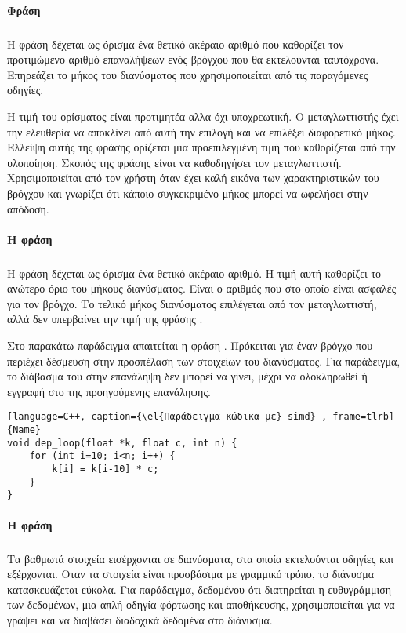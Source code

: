 \paragraph{Φράση \emph{}}
\subparagraph{}
Η φράση \emph{} δέχεται ως όρισμα ένα θετικό ακέραιο αριθμό που καθορίζει τον προτιμώμενο αριθμό επαναλήψεων ενός βρόγχου που θα εκτελούνται ταυτόχρονα. Επηρεάζει το μήκος του διανύσματος που χρησιμοποιείται από τις παραγόμενες \emph{} οδηγίες.

Η τιμή του ορίσματος είναι προτιμητέα αλλα όχι υποχρεωτική. Ο μεταγλωττιστής έχει την ελευθερία να αποκλίνει από αυτή την επιλογή και να επιλέξει διαφορετικό μήκος. Ελλείψη αυτής της φράσης ορίζεται μια προεπιλεγμένη τιμή που καθορίζεται από την υλοποίηση. Σκοπός της φράσης \emph{} είναι να καθοδηγήσει τον μεταγλωττιστή. Χρησιμοποιείται από τον χρήστη όταν έχει καλή εικόνα των χαρακτηριστικών του βρόγχου και γνωρίζει ότι κάποιο συγκεκριμένο μήκος μπορεί να ωφελήσει στην απόδοση.
\ \\

\paragraph{H φράση \emph{}}
\subparagraph{}
Η φράση \emph{} δέχεται ως όρισμα ένα θετικό ακέραιο αριθμό. Η τιμή αυτή καθορίζει το ανώτερο όριο του μήκους διανύσματος. Είναι ο αριθμός που στο οποίο είναι ασφαλές για τον βρόγχο. Το τελικό μήκος διανύσματος επιλέγεται από τον μεταγλωττιστή, αλλά δεν υπερβαίνει την τιμή της φράσης 
\emph{}.

Στο παρακάτω παράδειγμα απαιτείται η φράση \emph{}. Πρόκειται για έναν βρόγχο που περιέχει
 δέσμευση στην προσπέλαση των στοιχείων του διανύσματος.
 Για παράδειγμα, το διάβασμα του \emph{\en{[i-10]}} στην επανάληψη \emph{} δεν μπορεί να γίνει, μέχρι να ολοκληρωθεί ή εγγραφή στο \emph{} της προηγούμενης επανάληψης.
 
 \clearpage

\begin{lstlisting}[language=C++, caption={\el{Παράδειγμα κώδικα με} simd} , frame=tlrb]{Name}
void dep_loop(float *k, float c, int n) {
	for (int i=10; i<n; i++) {
		k[i] = k[i-10] * c;
	}
}
\end{lstlisting}

\paragraph{H φράση \emph{}}
\subparagraph{}
Τα βαθμωτά στοιχεία εισέρχονται σε διανύσματα, στα οποία εκτελούνται οδηγίες \emph{} και εξέρχονται. Οταν τα στοιχεία είναι προσβάσιμα με γραμμικό τρόπο, το διάνυσμα κατασκευάζεται εύκολα. Για παράδειγμα, δεδομένου ότι διατηρείται η ευθυγράμμιση των δεδομένων, μια απλή \emph{} οδηγία φόρτωσης και αποθήκευσης, χρησιμοποιείται για να γράψει και να διαβάσει διαδοχικά δεδομένα στο διάνυσμα.

